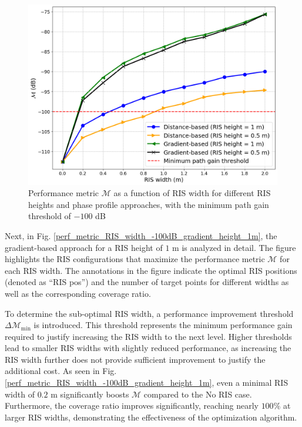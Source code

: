 \documentclass{IEEEoj}
\begin{document}
\begin{figure}
	\centering
	\includegraphics[width=\linewidth]{Sim_Results/perf_metric_RIS_width_multiple_curves_-100dB.png}
	\caption{Performance metric $\mathcal{M}$ as a function of RIS width for different RIS heights and phase profile approaches, with the minimum path gain threshold of $-100$ dB}
	\label{perf_metric_RIS_width_multiple_curves_-100dB}
\end{figure}

Next, in Fig. \ref{perf_metric_RIS_width_-100dB_gradient_height_1m}, the gradient-based approach for a RIS height of $1$ m is analyzed in detail. The figure highlights the RIS configurations that maximize the performance metric $\mathcal{M}$ for each RIS width. The annotations in the figure indicate the optimal RIS positions (denoted as “RIS pos”) and the number of target points for different widths as well as the corresponding coverage ratio.

To determine the sub-optimal RIS width, a performance improvement threshold $\Delta \mathcal{M}_{\text{min}}$ is introduced. This threshold represents the minimum performance gain required to justify increasing the RIS width to the next level. Higher thresholds lead to smaller RIS widths with slightly reduced performance, as increasing the RIS width further does not provide sufficient improvement to justify the additional cost. As seen in Fig. \ref{perf_metric_RIS_width_-100dB_gradient_height_1m}, even a minimal RIS width of $0.2$ m significantly boosts $\mathcal{M}$ compared to the No RIS case. Furthermore, the coverage ratio improves significantly, reaching nearly $100\%$ at larger RIS widths, demonstrating the effectiveness of the optimization algorithm.
\end{document}
